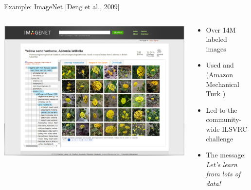 \documentclass[usenames,dvipsnames,notes,11pt,aspectratio=169,hyperref={colorlinks=true, linkcolor=blue}]{beamer}
\begin{document}
\begin{frame}
    {Example: ImageNet [Deng et al., 2009]}
    \begin{columns}
        \begin{column}{0.5\textwidth}
            \includegraphics[width=\textwidth]{figures/imagenet}
        \end{column}
        \begin{column}{0.5\textwidth}
            \begin{itemize}
                \item Over 14M labeled images
                \item Used  and  (Amazon Mechanical Turk ) 
                \item Led to the community-wide ILSVRC challenge
                \item The message:\\
                    \textit{Let's learn from lots of data!}
            \end{itemize}
        \end{column}
    \end{columns}
\end{frame}
\end{document}
